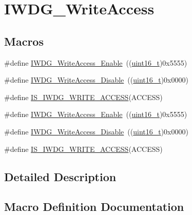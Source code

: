 \hypertarget{group___i_w_d_g___write_access}{}\section{I\+W\+D\+G\+\_\+\+Write\+Access}
\label{group___i_w_d_g___write_access}
\subsection*{Macros}
\begin{DoxyCompactItemize}
\item 
\#define \hyperlink{group___i_w_d_g___write_access_ga86f4b926f4351e19ea069f98c2e65f91}{I\+W\+D\+G\+\_\+\+Write\+Access\+\_\+\+Enable}~((\hyperlink{_p_e___types_8h_a1f1825b69244eb3ad2c7165ddc99c956}{uint16\+\_\+t})0x5555)
\item 
\#define \hyperlink{group___i_w_d_g___write_access_ga4b395cf5b2d7ab18fc71a5f779f758cc}{I\+W\+D\+G\+\_\+\+Write\+Access\+\_\+\+Disable}~((\hyperlink{_p_e___types_8h_a1f1825b69244eb3ad2c7165ddc99c956}{uint16\+\_\+t})0x0000)
\item 
\#define \hyperlink{group___i_w_d_g___write_access_gaa89c93332f5977175f8d416b7492de18}{I\+S\+\_\+\+I\+W\+D\+G\+\_\+\+W\+R\+I\+T\+E\+\_\+\+A\+C\+C\+E\+SS}(A\+C\+C\+E\+SS)
\item 
\#define \hyperlink{group___i_w_d_g___write_access_ga86f4b926f4351e19ea069f98c2e65f91}{I\+W\+D\+G\+\_\+\+Write\+Access\+\_\+\+Enable}~((\hyperlink{_p_e___types_8h_a1f1825b69244eb3ad2c7165ddc99c956}{uint16\+\_\+t})0x5555)
\item 
\#define \hyperlink{group___i_w_d_g___write_access_ga4b395cf5b2d7ab18fc71a5f779f758cc}{I\+W\+D\+G\+\_\+\+Write\+Access\+\_\+\+Disable}~((\hyperlink{_p_e___types_8h_a1f1825b69244eb3ad2c7165ddc99c956}{uint16\+\_\+t})0x0000)
\item 
\#define \hyperlink{group___i_w_d_g___write_access_gaa89c93332f5977175f8d416b7492de18}{I\+S\+\_\+\+I\+W\+D\+G\+\_\+\+W\+R\+I\+T\+E\+\_\+\+A\+C\+C\+E\+SS}(A\+C\+C\+E\+SS)
\end{DoxyCompactItemize}


\subsection{Detailed Description}


\subsection{Macro Definition Documentation}
